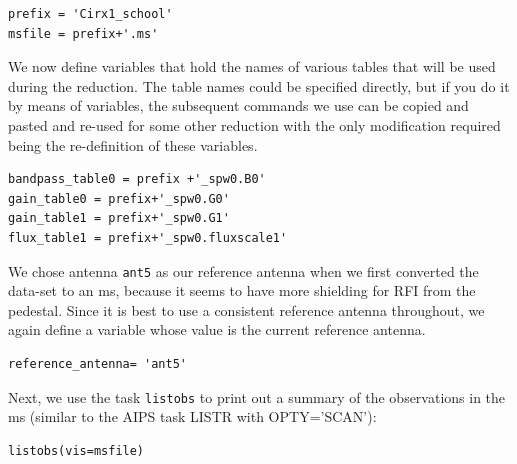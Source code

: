 \documentclass[force,almostfull,justified]{tufte-book}
\begin{document}
\bigskip
\begin{casacmd}
\begin{verbatim}
prefix = 'Cirx1_school'
msfile = prefix+'.ms'
\end{verbatim}
\end{casacmd}

\bigskip
We now define variables that hold the names of various tables that will be used during the reduction.
The table names could be specified directly, but if you do it by means of variables, the subsequent
commands we use can be copied and pasted and re-used for some other reduction with the only
modification required being the re-definition of these variables.

\begin{casacmd}
\begin{verbatim}
bandpass_table0 = prefix +'_spw0.B0'
gain_table0 = prefix+'_spw0.G0'
gain_table1 = prefix+'_spw0.G1'
flux_table1 = prefix+'_spw0.fluxscale1'
\end{verbatim}
\end{casacmd}

We chose antenna {\tt ant5} as our reference antenna when we first converted the data-set to an ms,
because it seems to have more shielding for RFI from the pedestal.  Since it is best to use a
consistent reference antenna throughout, we again define a variable whose value is the current
reference antenna.

\begin{casacmd}
\begin{verbatim}
reference_antenna= 'ant5'
\end{verbatim}
\end{casacmd}

Next, we use the task {\tt listobs} to print out a summary of the observations in the ms (similar to
the AIPS task LISTR with OPTY='SCAN'):

\begin{casacmd}
\begin{verbatim}
listobs(vis=msfile)
\end{verbatim}
\end{casacmd}

\end{document}
